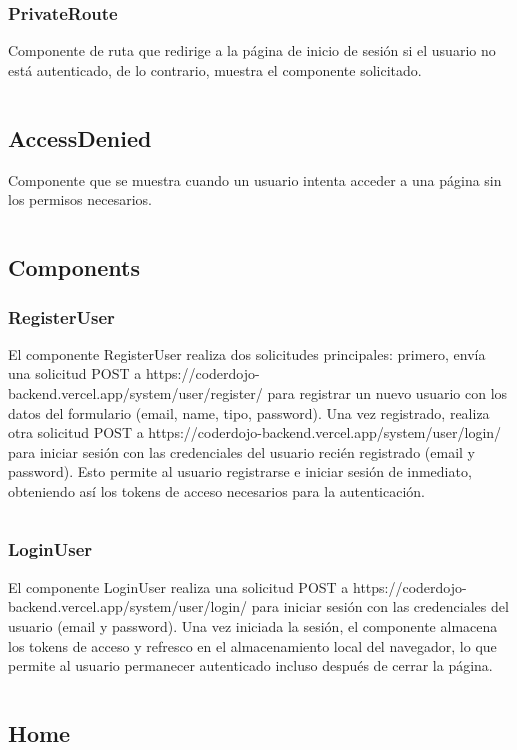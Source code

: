 \documentclass{article}
\begin{document}
\subsubsection{PrivateRoute}
Componente de ruta que redirige a la página de inicio de sesión si el usuario no está autenticado, de lo contrario, muestra el componente solicitado.
\inputminted{javascript}{../fronted/src/components/PrivateRoute.jsx}
\subsection{AccessDenied}
Componente que se muestra cuando un usuario intenta acceder a una página sin los permisos necesarios.
\inputminted{javascript}{../fronted/src/components/AccessDenied.jsx}
\subsection{Components}
\subsubsection{RegisterUser}
El componente RegisterUser realiza dos solicitudes principales: primero, envía una solicitud POST a https://coderdojo-backend.vercel.app/system/user/register/ para registrar un nuevo usuario con los datos del formulario (email, name, tipo, password). Una vez registrado, realiza otra solicitud POST a https://coderdojo-backend.vercel.app/system/user/login/ para iniciar sesión con las credenciales del usuario recién registrado (email y password). Esto permite al usuario registrarse e iniciar sesión de inmediato, obteniendo así los tokens de acceso necesarios para la autenticación.
\inputminted{javascript}{../fronted/src/components/RegisterUser.jsx}
\subsubsection{LoginUser}
El componente LoginUser realiza una solicitud POST a https://coderdojo-backend.vercel.app/system/user/login/ para iniciar sesión con las credenciales del usuario (email y password). Una vez iniciada la sesión, el componente almacena los tokens de acceso y refresco en el almacenamiento local del navegador, lo que permite al usuario permanecer autenticado incluso después de cerrar la página.
\inputminted{javascript}{../fronted/src/components/LoginUser.jsx}

\subsection{Home}
\end{document}
